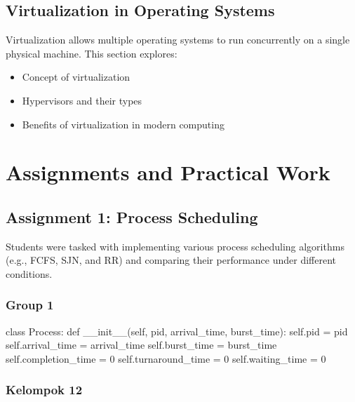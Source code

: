 \documentclass[12pt]{article}
\begin{document}
\subsection{Virtualization in Operating Systems}
Virtualization allows multiple operating systems to run concurrently on a single physical machine. This section explores:
\begin{itemize}
    \item Concept of virtualization
    \item Hypervisors and their types
    \item Benefits of virtualization in modern computing
\end{itemize}

\section{Assignments and Practical Work}
\subsection{Assignment 1: Process Scheduling}
Students were tasked with implementing various process scheduling algorithms (e.g., FCFS, SJN, and RR) and comparing their performance under different conditions.
\subsubsection{Group 1}
\begin{python}
    class Process:
    def __init__(self, pid, arrival_time, burst_time):
        self.pid = pid
        self.arrival_time = arrival_time
        self.burst_time = burst_time
        self.completion_time = 0
        self.turnaround_time = 0
        self.waiting_time = 0
\end{python}

\subsubsection{Kelompok 12}


\end{document}
